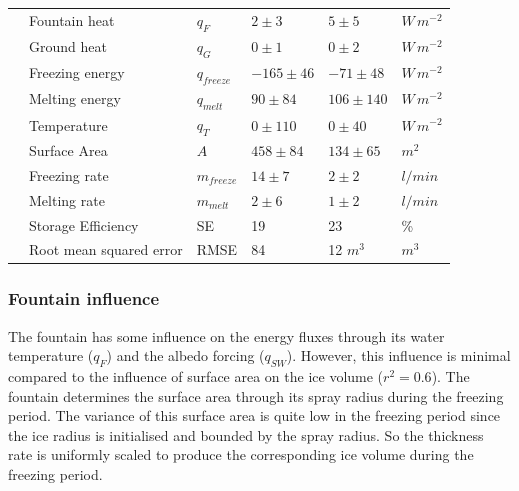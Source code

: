 \documentclass[utf8]{frontiersSCNS} %
\begin{document}
\begin{table}
\begin{tabular}{@{}|llllll|@{}}
		\multicolumn{1}{|l|}{} & Fountain heat           & $q_{F}  $       & $2 \pm 3$     & $5 \pm 5$     & $W\,m^{-2}$ \\
		\multicolumn{1}{|l|}{} & Ground heat             & $q_{G}   $      & $0 \pm 1$     & $0 \pm 2$     & $W\,m^{-2}$ \\
		\multicolumn{1}{|l|}{} & Freezing energy         & $q_{freeze} $   & $-165\pm 46$  & $-71 \pm 48$  & $W\,m^{-2}$ \\
		\multicolumn{1}{|l|}{} & Melting energy          & $q_{melt}  $    & $90 \pm 84$   & $106\pm 140$  & $W\,m^{-2}$ \\
		\multicolumn{1}{|l|}{} & Temperature             & $q_{T}  $       & $0 \pm 110$   & $0 \pm 40$    & $W\,m^{-2}$ \\
		\multicolumn{1}{|l|}{} & Surface Area            & $A$             & $458 \pm 84$  & $134 \pm 65$  & $m^{2}$     \\\midrule
		\multicolumn{1}{|l|}{\multirow{4}{*}{\rotatebox[origin=c]{90}{Charecteristics}}}

		                       & Freezing rate           & $m_{freeze}$    & $14 \pm 7$    & $2 \pm 2$     & $l/min$     \\
		\multicolumn{1}{|l|}{} & Melting rate            & $m_{melt}$      & $2 \pm 6$     & $1 \pm 2$     & $l/min$     \\
		\multicolumn{1}{|l|}{} & Storage Efficiency      & SE              & 19            & 23            & \%          \\
		\multicolumn{1}{|l|}{} & Root mean squared error & RMSE            & 84            & 12 $m^{3}$    & $m^{3}$     \\\bottomrule
	\end{tabular}
\end{table}

\subsubsection{Fountain influence}

The fountain has some influence on the energy fluxes through its water temperature ($q_{F}$) and the albedo forcing
($q_{SW}$). However, this influence is minimal compared to the influence of surface area on the ice volume
($r^2=0.6$). The fountain determines the surface area through its spray radius during the freezing period. The
variance of this surface area is quite low in the freezing period since the ice radius is initialised and bounded
by the spray radius. So the thickness rate is uniformly scaled to produce the corresponding ice volume during the
freezing period.
\end{document}
